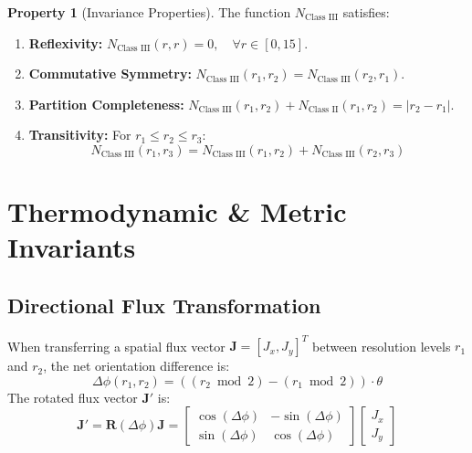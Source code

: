 \documentclass[11pt,a4paper]{article}
\theoremstyle{definition}
\newtheorem{property}{Property}
\begin{document}
\begin{property}[Invariance Properties]
The function $N_{\text{Class III}}$ satisfies:
\begin{enumerate}
    \item \textbf{Reflexivity:} $N_{\text{Class III}}(r, r) = 0, \quad \forall r \in [0, 15]$.
    \item \textbf{Commutative Symmetry:} $N_{\text{Class III}}(r_1, r_2) = N_{\text{Class III}}(r_2, r_1)$.
    \item \textbf{Partition Completeness:} $N_{\text{Class III}}(r_1, r_2) + N_{\text{Class II}}(r_1, r_2) = |r_2 - r_1|$.
    \item \textbf{Transitivity:} For $r_1 \le r_2 \le r_3$:
    \begin{equation}
    N_{\text{Class III}}(r_1, r_3) = N_{\text{Class III}}(r_1, r_2) + N_{\text{Class III}}(r_2, r_3)
    \end{equation}
\end{enumerate}
\end{property}

\section{Thermodynamic & Metric Invariants}

\subsection{Directional Flux Transformation}
When transferring a spatial flux vector $\mathbf{J} = [J_x, J_y]^T$ between resolution levels $r_1$ and $r_2$, the net orientation difference is:
\begin{equation}
\Delta \phi(r_1, r_2) = ((r_2 \bmod 2) - (r_1 \bmod 2)) \cdot \theta
\end{equation}
The rotated flux vector $\mathbf{J}'$ is:
\begin{equation}
\mathbf{J}' = \mathbf{R}(\Delta \phi) \mathbf{J} = \begin{bmatrix} \cos(\Delta \phi) & -\sin(\Delta \phi) \\ \sin(\Delta \phi) & \cos(\Delta \phi) \end{bmatrix} \begin{bmatrix} J_x \\ J_y \end{bmatrix}
\end{equation}
\end{document}
